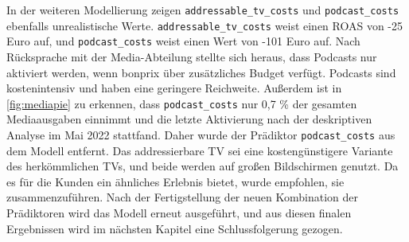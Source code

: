 In der weiteren Modellierung zeigen \verb|addressable_tv_costs| und \verb|podcast_costs| ebenfalls unrealistische Werte. \verb|addressable_tv_costs| weist einen \ac{ROAS} von -25 Euro auf, und \verb|podcast_costs| weist einen Wert von -101 Euro auf. Nach Rücksprache mit der Media-Abteilung stellte sich heraus, dass Podcasts nur aktiviert werden, wenn bonprix über zusätzliches Budget verfügt. Podcasts sind kostenintensiv und haben eine geringere Reichweite. Außerdem ist in \autoref{fig:mediapie} zu erkennen, dass \verb|podcast_costs| nur 0,7 \% der gesamten Mediaausgaben einnimmt und die letzte Aktivierung nach der deskriptiven Analyse im Mai 2022 stattfand. Daher wurde der Prädiktor \verb|podcast_costs| aus dem Modell entfernt. Das addressierbare TV sei eine kostengünstigere Variante des herkömmlichen TVs, und beide werden auf großen Bildschirmen genutzt. Da es für die Kunden ein ähnliches Erlebnis bietet, wurde empfohlen, sie zusammenzuführen. Nach der Fertigstellung der neuen Kombination der Prädiktoren wird das Modell erneut ausgeführt, und aus diesen finalen Ergebnissen wird im nächsten Kapitel eine Schlussfolgerung gezogen. 
